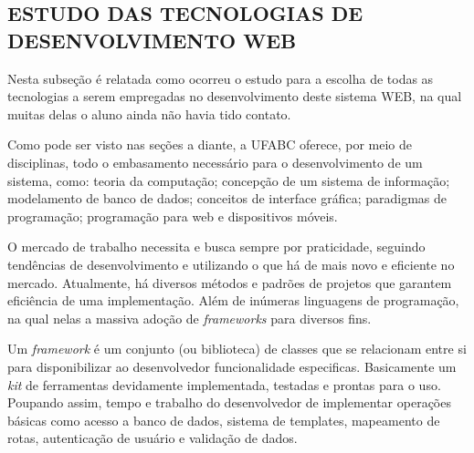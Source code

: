 \documentclass[
  12pt,				%
  openany,
  oneside,
  a4paper,			%
  english,			%
  brazil
]{article}
\numberwithin{figure}{section}
\numberwithin{table}{section}
\begin{document}




\subsection{ESTUDO DAS TECNOLOGIAS DE DESENVOLVIMENTO WEB}

Nesta subseção é relatada como ocorreu o estudo para a escolha de todas as tecnologias a serem empregadas no desenvolvimento deste sistema WEB, na qual muitas delas o aluno ainda não havia tido contato.

Como pode ser visto nas seções a diante, a UFABC oferece, por meio de disciplinas, todo o embasamento necessário para o desenvolvimento de um sistema, como: teoria da computação; concepção de um sistema de informação; modelamento de banco de dados; conceitos de interface gráfica; paradigmas de programação; programação para web e dispositivos móveis. 

O mercado de trabalho necessita e busca sempre por praticidade, seguindo tendências de desenvolvimento e utilizando o que há de mais novo e eficiente no mercado. Atualmente, há diversos métodos e padrões de projetos que garantem eficiência de uma implementação. Além de inúmeras linguagens de programação, na qual nelas a massiva adoção de \textit{frameworks} para diversos fins.

Um \textit{framework} é um conjunto (ou biblioteca) de classes que se relacionam entre si para disponibilizar ao desenvolvedor funcionalidade especificas. Basicamente um \textit{kit} de ferramentas devidamente implementada, testadas e prontas para o uso. Poupando assim, tempo e trabalho do desenvolvedor de implementar operações básicas como acesso a banco de dados, sistema de templates, mapeamento de rotas, autenticação de usuário e validação de dados.
\end{document}
